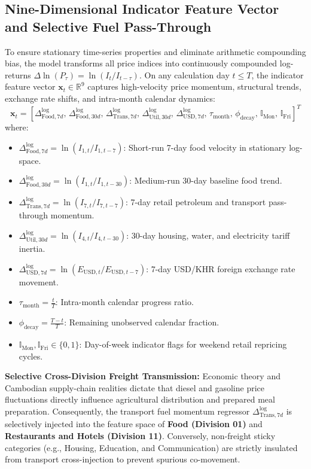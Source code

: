 \subsection{Nine-Dimensional Indicator Feature Vector and Selective Fuel Pass-Through}
\hs To ensure stationary time-series properties and eliminate arithmetic compounding bias, the model transforms all price indices into continuously compounded log-returns $\Delta \ln(P_\tau) = \ln(I_t / I_{t-\tau})$. On any calculation day $t \le T$, the indicator feature vector $\mathbf{x}_t \in \mathbb{R}^9$ captures high-velocity price momentum, structural trends, exchange rate shifts, and intra-month calendar dynamics:
\begin{equation}
    \mathbf{x}_t = \left[ \Delta_{\text{Food}, 7d}^{\log}, \, \Delta_{\text{Food}, 30d}^{\log}, \, \Delta_{\text{Trans}, 7d}^{\log}, \, \Delta_{\text{Util}, 30d}^{\log}, \, \Delta_{\text{USD}, 7d}^{\log}, \, \tau_{\text{month}}, \, \phi_{\text{decay}}, \, \mathbb{I}_{\text{Mon}}, \, \mathbb{I}_{\text{Fri}} \right]^T
\end{equation}
where:
\begin{itemize}
    \item $\Delta_{\text{Food}, 7d}^{\log} = \ln(I_{1, t} / I_{1, t-7})$: Short-run 7-day food velocity in stationary log-space.
    \item $\Delta_{\text{Food}, 30d}^{\log} = \ln(I_{1, t} / I_{1, t-30})$: Medium-run 30-day baseline food trend.
    \item $\Delta_{\text{Trans}, 7d}^{\log} = \ln(I_{7, t} / I_{7, t-7})$: 7-day retail petroleum and transport pass-through momentum.
    \item $\Delta_{\text{Util}, 30d}^{\log} = \ln(I_{4, t} / I_{4, t-30})$: 30-day housing, water, and electricity tariff inertia.
    \item $\Delta_{\text{USD}, 7d}^{\log} = \ln(E_{\text{USD}, t} / E_{\text{USD}, t-7})$: 7-day USD/KHR foreign exchange rate movement.
    \item $\tau_{\text{month}} = \frac{t}{T}$: Intra-month calendar progress ratio.
    \item $\phi_{\text{decay}} = \frac{T - t}{T}$: Remaining unobserved calendar fraction.
    \item $\mathbb{I}_{\text{Mon}}, \mathbb{I}_{\text{Fri}} \in \{0, 1\}$: Day-of-week indicator flags for weekend retail repricing cycles.
\end{itemize}

\hs \textbf{Selective Cross-Division Freight Transmission:} Economic theory and Cambodian supply-chain realities dictate that diesel and gasoline price fluctuations directly influence agricultural distribution and prepared meal preparation. Consequently, the transport fuel momentum regressor $\Delta_{\text{Trans}, 7d}^{\log}$ is selectively injected into the feature space of \textbf{Food (Division 01)} and \textbf{Restaurants and Hotels (Division 11)}. Conversely, non-freight sticky categories (e.g., Housing, Education, and Communication) are strictly insulated from transport cross-injection to prevent spurious co-movement.

